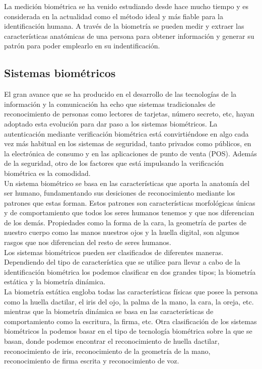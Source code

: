 La medición biométrica se ha venido estudiando desde hace mucho tiempo y es considerada en la actualidad como el método ideal y más fiable para la identificación humana. A través de la biometría se pueden medir y extraer las características anatómicas de una persona para obtener información y generar su patrón para poder emplearlo en su indentificación. \\


\subsection{Sistemas biométricos}

El gran avance que se ha producido en el desarrollo de las tecnologías de la información y la comunicación ha echo que sistemas tradicionales de reconocimiento de personas como lectores de tarjetas, número secreto, etc, hayan adoptado esta evolución para dar paso a los sistemas biométricos. La autenticación mediante verificación biométrica está convirtiéndose en algo cada vez más habitual en los sistemas de seguridad, tanto privados como públicos, en la electrónica de consumo y en las aplicaciones de punto de venta (POS). Además de la seguridad, otro de los factores que está impulsando la verificación biométrica es la comodidad. \\

Un sistema biométrico se basa en las características que aporta la anatomía del ser humano, fundamentando sus desiciones de reconocimiento mediante los patrones que estas forman. Estos patrones son características morfológicas únicas y de comportamiento que todos los seres humanos tenemos y que nos diferencian de los demás. Propiedades como la forma de la cara, la geometría de partes de nuestro cuerpo como las manos nuestros ojos y la huella digital, son algunos rasgos que nos diferencian del resto de seres humanos.\\

Los sistemas biométricos pueden ser clasificados de diferentes maneras. Dependiendo del tipo de característica que se utilice para llevar a cabo de la identificación biométrica los podemos clasificar en dos grandes tipos; la biometría estática y la biometría dinámica. \\

La biometría estática engloba todas las características físicas que posee la persona como la huella dactilar, el iris del ojo, la palma de la mano, la cara, la oreja, etc. mientras que la biometría dinámica se basa en las características de comportamiento como la escritura, la firma, etc. 
Otra clasificación de los sistemas biométricos la podemos basar en el tipo de tecnología biométrica sobre la que se basan, donde podemos encontrar el reconocimiento de huella dactilar, reconocimiento de iris, reconocimiento de la geometría de la mano, reconocimiento de firma escrita y reconocimiento de voz.\\

